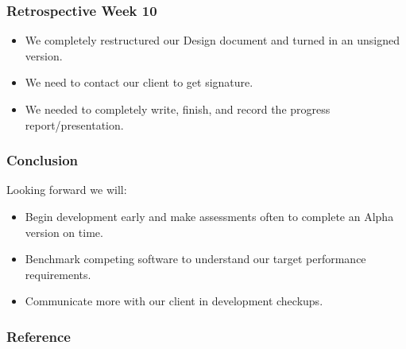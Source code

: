 \documentclass[pdf]{beamer}
\begin{document}
\begin{frame}
  \frametitle{Retrospective Week 10}
  \begin{itemize}
    \item We completely restructured our Design document and turned in an unsigned version.
    \item We need to contact our client to get signature.  
    \item We needed to completely write, finish, and record the progress report/presentation. 
  \end{itemize}
\end{frame}

\begin{frame}
  \frametitle{Conclusion}
  Looking forward we will: 
  \begin{itemize}
    \item Begin development early and make assessments often to complete an Alpha version on time.
    \item Benchmark competing software to understand our target performance requirements. 
  	\item Communicate more with our client in development checkups.
  \end{itemize}
\end{frame}

\begin{frame}
	\frametitle{Reference}
    \printbibliography
\end{frame}
\end{document}
